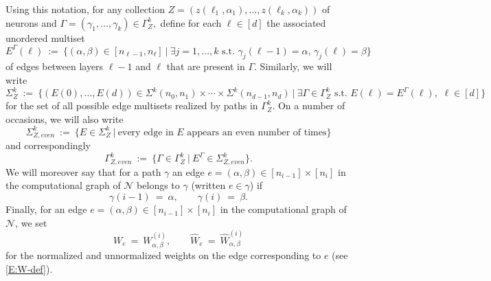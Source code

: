 \documentclass[11pt, reqno]{amsart}
\newcommand{\x}{\ensuremath{\times}}
\newcommand{\lr}[1]{\ensuremath{\left(#1 \right)}}
\newcommand{\set}[1]{\ensuremath{\{#1\}}}
\newcommand{\mN}{\mathcal N}
\begin{document}
\noindent Using this notation, for any collection $Z=\lr{z(\ell_1,\alpha_1),\ldots, z(\ell_k,\alpha_k)}$ of neurons and $\Gamma = \lr{\gamma_1,\ldots, \gamma_k}\in \Gamma_Z^k,$ define for each $\ell\in [d]$ the associated unordered multiset
\[E^\Gamma(\ell)~:=~\set{(\alpha, \beta)\in [n_{\ell-1},n_\ell]~|~\exists j=1,\ldots, k\text{ s.t. } \gamma_j(\ell-1)=\alpha,\, \gamma_j(\ell)=\beta}\]
of edges between layers $\ell-1$ and $\ell$ that are present in $\Gamma.$ Similarly, we will write
\begin{equation}\label{E:Sigma-def}
   \Sigma_Z^k~:=~\set{\lr{E(0),\ldots, E(d)}\in \Sigma^k(n_0,n_1)\times \cdots\times \Sigma^k(n_{d-1},n_d)~|~\exists \Gamma\in \Gamma_Z^k\text{ s.t. } E(\ell)=E^\Gamma(\ell),\,\, \ell\in [d] } 
\end{equation}
for the set of all possible edge multisets realized by paths in $\Gamma_Z^k.$ On a number of occasions, we will also write
\[\Sigma_{Z, even}^k~:=~\set{E\in \Sigma_Z^k~|~\text{every edge in }E\text{ appears an even number of times}}\]
and correspondingly
\[\Gamma_{Z,even}^k~:=~\set{\Gamma\in \Gamma_{Z}^k~|~E^{\Gamma}\in \Sigma_{Z,even}^k}.\]
We will moreover say that for a path $\gamma$ an edge $e=(\alpha,\beta)\in [n_{i-1}]\x [n_i]$ in the computational graph of $\mN$ belongs to $\gamma$ (written $e\in \gamma$) if 
\begin{equation}\label{E:edge-in-path}
\gamma(i-1)~=~\alpha,\qquad \gamma(i)~=~\beta.
\end{equation}
Finally, for an edge $e=(\alpha,\beta)\in [n_{i-1}]\x [n_i]$ in the computational graph of $\mN$, we set
\[W_e~=~W_{\alpha,\beta}^{(i)},\qquad \widehat{W}_e~=~\widehat{W}_{\alpha,\beta}^{(i)}\]
for the normalized and unnormalized weights on the edge corresponding to $e$ (see \eqref{E:W-def}). 
\end{document}
